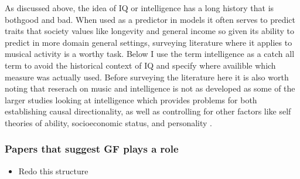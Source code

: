 \documentclass[]{book}
\providecommand{\tightlist}{%
  \setlength{\itemsep}{0pt}\setlength{\parskip}{0pt}}
\begin{document}
As discussed above, the idea of IQ or intelligence has a long history that is bothgood and bad.
When used as a predictor in models it often serves to predict traits that society values like longevity and general income so given its ability to predict in more domain general settings, surveying literature where it applies to musical activity is a worthy task.
Below I use the term intelligence as a catch all term to avoid the historical context of IQ and specify where availible which measure was actually used.
Before surveying the literature here it is also worth noting that reserach on music and intelligence is not as developed as some of the larger studies looking at intelligence which provides problems for both establishing causal directionality, as well as controlling for other factors like self theories of ability, socioeconomic status, and personality \citep{mullensiefenInvestigatingImportanceSelftheories2015}.

\hypertarget{papers-that-suggest-gf-plays-a-role}{%
\subsubsection{Papers that suggest GF plays a role}\label{papers-that-suggest-gf-plays-a-role}}

\begin{itemize}
\tightlist
\item
  Redo this structure
\end{itemize}
\end{document}
